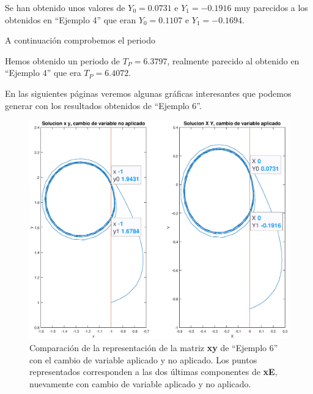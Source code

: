 \documentclass[12pt,a4paper]{report} %
\begin{document}
	\vspace{1cm}
	
	\vspace{1cm}\noindent Se han obtenido unos valores de $Y_0=0.0731$ e $Y_1=-0.1916$ muy parecidos a los obtenidos en ``Ejemplo 4'' que eran $Y_0=0.1107$ e $Y_1=-0.1694$.
	
	\newpage
	
	\vspace{0.5cm}A continuación comprobemos el periodo
	
	\vspace{1cm}
	
	\vspace{1cm}\noindent Hemos obtenido un periodo de $T_P=6.3797$, realmente parecido al obtenido en ``Ejemplo 4'' que era $T_P=6.4072$.
	
    \vspace{1cm}En las siguientes páginas veremos algunas gráficas interesantes que podemos generar con los resultados obtenidos de ``Ejemplo 6''.
    
    \newpage
    
    	\begin{figure}[h]
    	\centering
    	\includegraphics[width=1.2\textwidth,center]{g1ejem6.eps}
    	\caption{Comparación de la representación de la matriz \textbf{xy} de ``Ejemplo 6'' con el cambio de variable aplicado y no aplicado. Los puntos representados corresponden a las dos últimas componentes de \textbf{xE}, nuevamente con cambio de variable aplicado y no aplicado.}
    	\label{fig:g1ejem6}
    \end{figure}\smallskip
    
\end{document}
